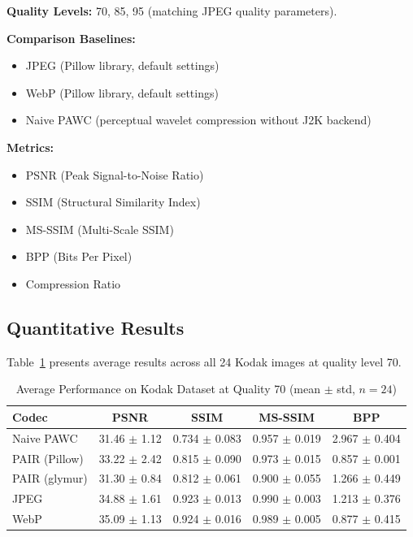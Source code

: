 \documentclass[conference]{IEEEtran}
\begin{document}
\textbf{Quality Levels:} 70, 85, 95 (matching JPEG quality parameters).

\textbf{Comparison Baselines:}
\begin{itemize}
    \item JPEG (Pillow library, default settings)
    \item WebP (Pillow library, default settings)
    \item Naive PAWC (perceptual wavelet compression without J2K backend)
\end{itemize}

\textbf{Metrics:}
\begin{itemize}
    \item PSNR (Peak Signal-to-Noise Ratio)
    \item SSIM (Structural Similarity Index)~\cite{wang2004image}
    \item MS-SSIM (Multi-Scale SSIM)~\cite{wang2003multiscale}
    \item BPP (Bits Per Pixel)
    \item Compression Ratio
\end{itemize}

\subsection{Quantitative Results}

Table~\ref{tab:kodak_q70} presents average results across all 24 Kodak images at quality level 70.

\begin{table}[htbp]
\caption{Average Performance on Kodak Dataset at Quality 70 (mean $\pm$ std, $n=24$)}
\begin{center}
\begin{tabular}{lcccc}
\toprule
\textbf{Codec} & \textbf{PSNR} & \textbf{SSIM} & \textbf{MS-SSIM} & \textbf{BPP} \\
\midrule
Naive PAWC & 31.46 $\pm$ 1.12 & 0.734 $\pm$ 0.083 & 0.957 $\pm$ 0.019 & 2.967 $\pm$ 0.404 \\
PAIR (Pillow) & 33.22 $\pm$ 2.42 & 0.815 $\pm$ 0.090 & 0.973 $\pm$ 0.015 & 0.857 $\pm$ 0.001 \\
PAIR (glymur) & 31.30 $\pm$ 0.84 & 0.812 $\pm$ 0.061 & 0.900 $\pm$ 0.055 & 1.266 $\pm$ 0.449 \\
JPEG & 34.88 $\pm$ 1.61 & 0.923 $\pm$ 0.013 & 0.990 $\pm$ 0.003 & 1.213 $\pm$ 0.376 \\
WebP & 35.09 $\pm$ 1.13 & 0.924 $\pm$ 0.016 & 0.989 $\pm$ 0.005 & 0.877 $\pm$ 0.415 \\
\bottomrule
\end{tabular}
\label{tab:kodak_q70}
\end{center}
\end{table}
\end{document}
